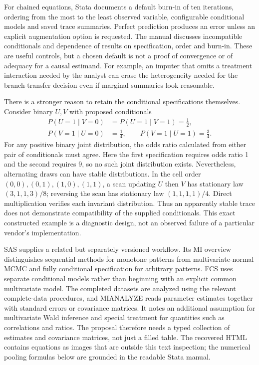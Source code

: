 For chained equations, Stata documents a default burn-in of ten iterations,
ordering from the most to the least observed variable, configurable conditional
models and saved trace summaries. Perfect prediction produces an error unless
an explicit augmentation option is requested. The manual discusses
incompatible conditionals and dependence of results on specification, order
and burn-in. These are useful controls, but a chosen default is not a proof of
convergence or of adequacy for a causal estimand. For example, an imputer that
omits a treatment interaction needed by the analyst can erase the heterogeneity
needed for the branch-transfer decision even if marginal summaries look
reasonable. \citep{exec21_transport_stata_chained,exec21_transport_stata_substantive}

There is a stronger reason to retain the conditional specifications themselves.
Consider binary $U,V$ with proposed conditionals
\begin{equation}
 \begin{aligned}
 P(U=1\mid V=0)&=P(U=1\mid V=1)=\tfrac12,\\
 P(V=1\mid U=0)&=\tfrac14,\qquad P(V=1\mid U=1)=\tfrac34.
 \end{aligned}
 \label{exec21:transport-conditionals}
\end{equation}
For any positive binary joint distribution, the odds ratio calculated from
either pair of conditionals must agree. Here the first specification requires
odds ratio 1 and the second requires 9, so no such joint distribution exists.
Nevertheless, alternating draws can have stable distributions. In the cell
order $(0,0),(0,1),(1,0),(1,1)$, a scan updating $U$ then $V$ has stationary
law $(3,1,1,3)/8$; reversing the scan has stationary law $(1,1,1,1)/4$.
Direct multiplication verifies each invariant distribution. Thus an apparently
stable trace does not demonstrate compatibility of the supplied conditionals.
This exact constructed example is a diagnostic design, not an observed failure
of a particular vendor's implementation. \citep{exec21_transport_reference}

SAS supplies a related but separately versioned workflow. Its MI overview
distinguishes sequential methods for monotone patterns from multivariate-normal
MCMC and fully conditional specification for arbitrary patterns. FCS uses
separate conditional models rather than beginning with an explicit common
multivariate model. The completed datasets are analyzed using the relevant
complete-data procedures, and MIANALYZE reads parameter estimates together with
standard errors or covariance matrices. It notes an additional assumption for
multivariate Wald inference and special treatment for quantities such as
correlations and ratios. The proposal therefore needs a typed collection of
estimates and covariance matrices, not just a filled table. The recovered HTML
contains equations as images that are outside this text inspection; the numerical
pooling formulas below are grounded in the readable Stata manual.
\citep{exec21_transport_sas_mi_intro,exec21_transport_sas_mianalyze_intro,exec21_transport_sas_combining}

